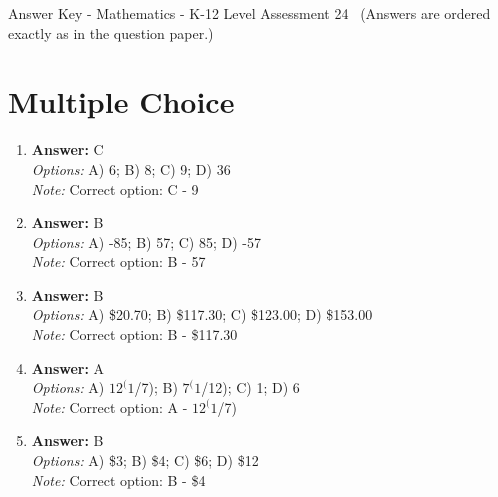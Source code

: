 \documentclass[12pt]{article}
\begin{document}
\begin{center}
Answer Key - Mathematics - K-12 Level Assessment 24 \
\small (Answers are ordered exactly as in the question paper.)
\end{center}

\section*{Multiple Choice}
\begin{enumerate}[label=\arabic*.]
\item \textbf{Answer:} C
\\ \textit{Options:} A) 6; B) 8; C) 9; D) 36
\\ \textit{Note:} Correct option: C - 9
\item \textbf{Answer:} B
\\ \textit{Options:} A) -85; B) 57; C) 85; D) -57
\\ \textit{Note:} Correct option: B - 57
\item \textbf{Answer:} B
\\ \textit{Options:} A) \$20.70; B) \$117.30; C) \$123.00; D) \$153.00
\\ \textit{Note:} Correct option: B - \$117.30
\item \textbf{Answer:} A
\\ \textit{Options:} A) $12^(1$/7); B) $7^(1$/12); C) 1; D) 6
\\ \textit{Note:} Correct option: A - $12^(1$/7)
\item \textbf{Answer:} B
\\ \textit{Options:} A) \$3; B) \$4; C) \$6; D) \$12
\\ \textit{Note:} Correct option: B - \$4
\end{enumerate}
\end{document}
